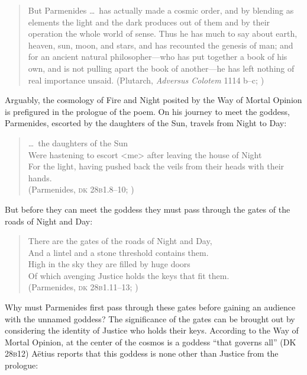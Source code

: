 \begin{quote}
    But Parmenides \ldots\ has actually made a cosmic order, and by blending as elements the light and the dark produces out of them and by their operation the whole world of sense. Thus he has much to say about earth, heaven, sun, moon, and stars, and has recounted the genesis of man; and for an ancient natural philosopher---who has put together a book of his own, and is not pulling apart the book of another---he has left nothing of real importance unsaid. (Plutarch, \emph{Adversus Colotem} 1114 b--c; \citealt[231]{Einarson:1967zr})
\end{quote}

Arguably, the cosmology of Fire and Night posited by the Way of Mortal Opinion is prefigured in the prologue of the poem. On his journey to meet the goddess, Parmenides, escorted by the daughters of the Sun, travels from Night to Day:
\begin{verse}
    \ldots\ the daughters of the Sun\\
    Were hastening to escort <me> after leaving the house of Night\\
    For the light, having pushed back the veils from their heads with their hands.\\ 
    (Parmenides, \textsc{dk} 28\textsc{b}1.8--10; \citealt[151]{McKirahan:1994ve})
\end{verse}
But before they can meet the goddess they must pass through the gates of the roads of Night and Day:
\begin{verse}
    There are the gates of the roads of Night and Day,\\
    And a lintel and a stone threshold contains them.\\ 
    High in the sky they are filled by huge doors\\
    Of which avenging Justice holds the keys that fit them.\\
    (Parmenides, \textsc{dk} 28\textsc{b}1.11--13; \citealt[151]{McKirahan:1994ve})
\end{verse}
Why must Parmenides first pass through these gates before gaining an audience with the unnamed goddess? The significance of the gates can be brought out by considering the identity of Justice who holds their keys. According to the Way of Mortal Opinion, at the center of the cosmos is a goddess ``that governs all'' (DK 28\textsc{b}12)  A\"{e}tius reports that this goddess is none other than Justice from the prologue:
